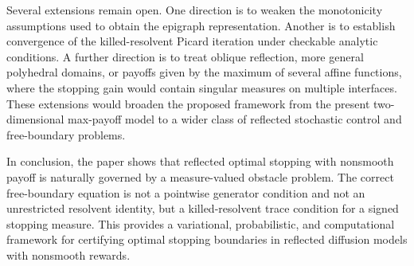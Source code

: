 \documentclass[pdflatex,sn-mathphys-num]{sn-jnl}
\theoremstyle{plain}
\theoremstyle{definition}
\theoremstyle{remark}
\numberwithin{equation}{section}
\begin{document}
Several extensions remain open. One direction is to weaken the monotonicity
assumptions used to obtain the epigraph representation. Another is to establish
convergence of the killed-resolvent Picard iteration under checkable analytic
conditions. A further direction is to treat oblique reflection, more general
polyhedral domains, or payoffs given by the maximum of several affine
functions, where the stopping gain would contain singular measures on multiple
interfaces. These extensions would broaden the proposed framework from the
present two-dimensional max-payoff model to a wider class of reflected
stochastic control and free-boundary problems.

In conclusion, the paper shows that reflected optimal stopping with nonsmooth
payoff is naturally governed by a measure-valued obstacle problem. The correct
free-boundary equation is not a pointwise generator condition and not an
unrestricted resolvent identity, but a killed-resolvent trace condition for a
signed stopping measure. This provides a variational, probabilistic, and
computational framework for certifying optimal stopping boundaries in reflected
diffusion models with nonsmooth rewards.


\end{document}
